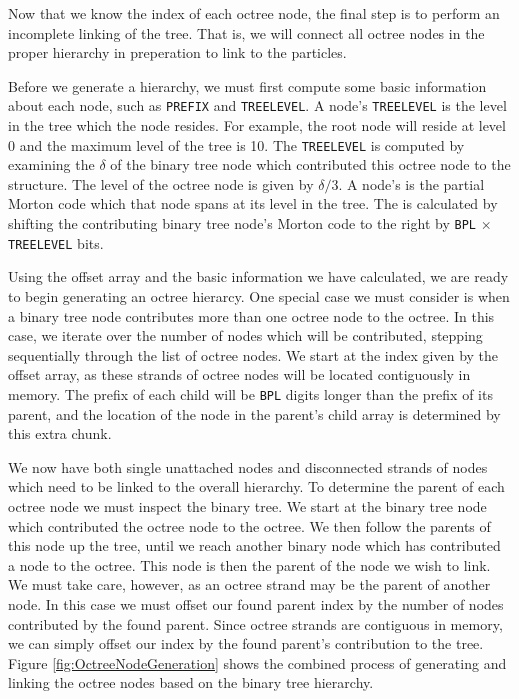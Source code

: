 \documentclass{thesis}
\begin{document}
Now that we know the index of each octree node, the final step is to perform an incomplete linking of the tree. That is, we will connect all octree nodes in the proper hierarchy in preperation to link to the particles.

Before we generate a hierarchy, we must first compute some basic information about each node, such as \texttt{PREFIX} and \texttt{TREELEVEL}. A node's \texttt{TREELEVEL} is the level in the tree which the node resides. For example, the root node will reside at level 0 and the maximum level of the tree is 10. The \texttt{TREELEVEL} is computed by examining the $\delta$ of the binary tree node which contributed this octree node to the structure. The level of the octree node is given by $\delta/3$. A node's  is the partial  Morton code which that node spans at its level in the tree. The  is calculated by shifting the contributing binary tree node's  Morton code to the right by \texttt{BPL} $\times$ \texttt{TREELEVEL} bits.  

Using the offset array and the basic information we have calculated, we are ready to begin generating an octree hierarcy. One special case we must consider is when a binary tree node contributes more than one octree node to the octree. In this case, we iterate over the number of nodes which will be contributed, stepping sequentially through the list of octree nodes. We start at the index given by the offset array, as these strands of octree nodes will be located contiguously in memory. The prefix of each child will be \texttt{BPL} digits longer than the prefix of its parent, and the location of the node in the parent's child array is determined by this extra chunk.

We now have both single unattached nodes and disconnected strands of nodes which need to be linked to the overall hierarchy. To determine the parent of each octree node we must inspect the binary tree. We start at the binary tree node which contributed the octree node to the octree. We then follow the parents of this node up the tree, until we reach another binary node which has contributed a node to the octree. This node is then the parent of the node we wish to link. We must take care, however, as an octree strand may be the parent of another node. In this case we must offset our found parent index by the number of nodes contributed by the found parent. Since octree strands are contiguous in memory, we can simply offset our index by the found parent's contribution to the tree. Figure \ref{fig:OctreeNodeGeneration} shows the combined process of generating and linking the octree nodes based on the binary tree hierarchy.
\end{document}
